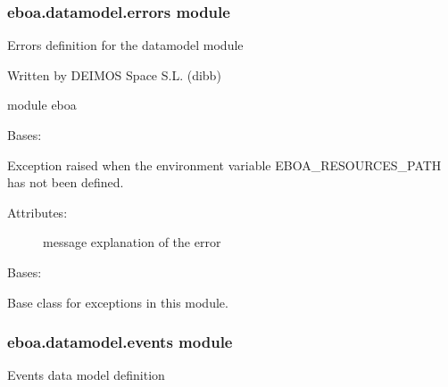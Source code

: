 \subsubsection{eboa.datamodel.errors module}
\label{\detokenize{eboa.datamodel:module-eboa.datamodel.errors}}\label{\detokenize{eboa.datamodel:eboa-datamodel-errors-module}}
Errors definition for the datamodel module

Written by DEIMOS Space S.L. (dibb)

module eboa

\begin{fulllineitems}
\label{\detokenize{eboa.datamodel:eboa.datamodel.errors.EboaResourcesPathNotAvailable}}
Bases: {\hyperref[\detokenize{eboa.datamodel:eboa.datamodel.errors.Error}]{}}

Exception raised when the environment variable EBOA\_RESOURCES\_PATH has not been defined.
\begin{description}
\item[{Attributes:}] \leavevmode
message \textendash{} explanation of the error

\end{description}

\end{fulllineitems}


\begin{fulllineitems}
\label{\detokenize{eboa.datamodel:eboa.datamodel.errors.Error}}
Bases: 

Base class for exceptions in this module.

\end{fulllineitems}



\subsubsection{eboa.datamodel.events module}
\label{\detokenize{eboa.datamodel:module-eboa.datamodel.events}}\label{\detokenize{eboa.datamodel:eboa-datamodel-events-module}}
Events data model definition


